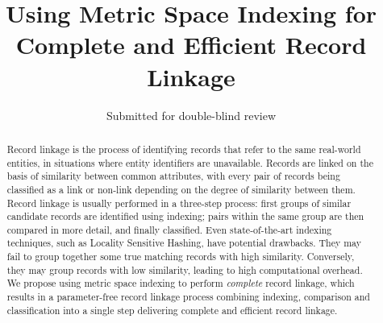 \documentclass{llncs}
\begin{document}
       
\title{Using Metric Space Indexing for Complete and Efficient Record Linkage}


\author{Submitted for double-blind review}

\maketitle

\begin{abstract}

Record linkage is the process of identifying records that refer to the
same real-world entities, in situations where entity identifiers are
unavailable. Records are linked on the basis of similarity between
common attributes, with every pair of records being classified as a
link or non-link depending on the degree of similarity between them.
Record linkage is usually performed in a three-step process: first
groups of similar candidate records are identified using indexing; 
pairs within the same group are then compared in more detail, and
finally classified.
%
Even state-of-the-art indexing techniques, such as Locality Sensitive
Hashing, have potential drawbacks. They may fail to group together some
true matching records with high similarity. Conversely, they may group
records with low similarity, leading to high computational overhead.
%
We propose using metric space indexing to perform \emph{complete} record
linkage, which results in a parameter-free record linkage process
combining indexing, comparison and classification into a single step
delivering complete and efficient record linkage.

\end{abstract}
\end{document}
